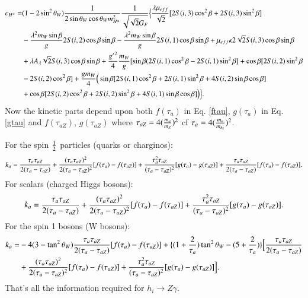 \documentclass[final,3p,times]{elsarticle}
\begin{document}
\begin{equation}
\begin{aligned}
c_{H^{\pm}} = & (1 - 2\sin^2 \theta_W){1 \over 2 \sin\theta_W \cos\theta_W  m_{H^{\pm}}^2} {1 \over \sqrt{\sqrt{2} G_{F}}} \Big\{ {\lambda \mu_{eff} \over \sqrt{2}}[2S(i,3)\cos^2 \beta + 2 S(i,3) \sin^2 \beta] \\ & - {\lambda^2 m_{W} \sin\beta \over g}2S(i,2)\cos\beta \sin\beta - {\lambda^2 m_{W} \sin\beta \over g} 2S(i,1)\cos\beta\sin\beta + \mu_{eff}\kappa 2 \sqrt{2} S(i,3)\cos\beta\sin\beta \\ & + \lambda A_{\lambda} \sqrt{2} S(i,3)\cos\beta \sin\beta + {{g'}^2 \over 4}{m_{W} \over g}[\sin\beta(2S(i,1)\cos^2 \beta - 2S(i,1) \sin^2 \beta] + \cos\beta[2S(i,2)\sin^2 \beta \\ & - 2 S(i,2) \cos^2 \beta] + {g m_{W} \over 4} \Big(\sin\beta [2S(i,1)\cos^2 \beta + 2S(i,1)\sin^2 \beta + 4S(i,2)\sin\beta \cos\beta] \\ & + \cos\beta[2S(i,2)\cos^2 \beta + 2S(i,2) \sin^2 \beta + 4S(i,1)\sin\beta \cos\beta]\Big) \Big\}.
\end{aligned}
\end{equation}
Now the kinetic parts depend upon both $f({\tau_{a}})$ in Eq. \eqref{ftau}, $g({\tau_{a}})$ in Eq. \eqref{gtau} and $f({\tau_{aZ}})$, $g({\tau_{aZ}})$ where $\tau_{aZ} = 4({m_{a} \over m_{Z}})^2$ cf $\tau_{a} = 4({m_{a} \over m_{h_i}})^2$.

For the spin ${1 \over 2}$ particles (quarks or charginos):
\begin{equation}
k_{a} =  {\tau_{a} \tau_{aZ} \over 2(\tau_{a} - \tau_{aZ})} +  {(\tau_{a} \tau_{aZ})^2 \over 2(\tau_{a} - \tau_{aZ})^2 } [f({\tau_{a}}) - f({\tau_{aZ}})] +  {\tau_{a}^2 \tau_{aZ} \over (\tau_{a} - \tau_{aZ})^2}[g({\tau_{a}}) - g({\tau_{aZ}})] +  {\tau_{a} \tau_{aZ} \over 2(\tau_{a} - \tau_{aZ})}[f({\tau_{a}}) - f({\tau_{aZ}})].
\end{equation}
For scalars (charged Higgs bosons):
\begin{equation}
k_{a} = {\tau_{a} \tau_{aZ}  \over 2 ({\tau_{a}} - {\tau_{aZ}})} + {(\tau_{a} \tau_{aZ})^2 \over 2(\tau_{a} - \tau_{aZ})^2}[f({\tau_{a}})-f({\tau_{aZ}})] + {\tau_{a}^2 \tau_{aZ} \over (\tau_{a} - \tau_{aZ})^2}[g({\tau_{a}}) - g({\tau_{aZ}})].
\end{equation}
For the spin 1 bosons (W bosons):
\begin{equation}
\begin{aligned}
k_{a} = & -4(3-\tan^2 \theta_W){\tau_{a}\tau_{aZ} \over 2 (\tau_{a} - \tau_{aZ})}[f({\tau_{a}}) - f({\tau_{aZ}})] + \{(1 + {2 \over \tau_{a}})\tan^2 \theta_W - (5 + {2 \over \tau_{a}})\}\Big[{\tau_{a} \tau_{aZ} \over 2(\tau_{a} - \tau_{aZ})} \\ & + {(\tau_{a} \tau_{aZ})^2 \over 2 (\tau_{a}-\tau_{aZ})^2}[f({\tau_{a}}) - f({\tau_{aZ}})] + {\tau_{a}^2 \tau_{aZ} \over (\tau_{a} - \tau_{aZ})^2}[g({\tau_{a}}) - g({\tau_{aZ}})]\Big]. 	
\end{aligned}	
\end{equation}
That's all the information required for $h_{i} \rightarrow Z \gamma$.
\end{document}

